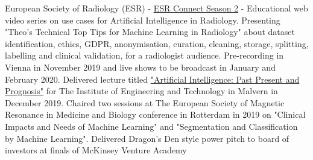 %
%
%


\begin{scholarship}
					{European Society of Radiology (ESR) - {\color{linkcolor}\href{https://connect.myesr.org/reasons-to-do-ai-with-friends/}{ESR Connect Season 2}}
					 - Educational web video series on use cases for Artificial Intelligence in Radiology.
					 Presenting "Theo's Technical Top Tips for Machine Learning in Radiology" about dataset identification,
					 ethics, GDPR, anonymisation, curation, cleaning, storage, splitting, labelling and clinical validation, for a radiologist audience.
					 Pre-recording in Vienna in November 2019 and live shows to be broadcast in January and February 2020.
					 }
					{Delivered lecture titled {\color{linkcolor}\href{https://communities.theiet.org/communities/events/item/155/77/23766}{"Artificial Intelligence: Past Present and Prognosis"}} for The Institute of
					 Engineering and Technology in Malvern in December 2019.}
					{Chaired two sessions at The European Society of Magnetic Resonance in Medicine and Biology conference
					 in Rotterdam in 2019 on "Clinical Impacts and Needs of Machine Learning" and
					 "Segmentation and Classification by Machine Learning".}
					{Delivered Dragon's Den style power pitch to board of investors at finals of McKinsey Venture Academy}

	\emptySeparator
\end{scholarship}